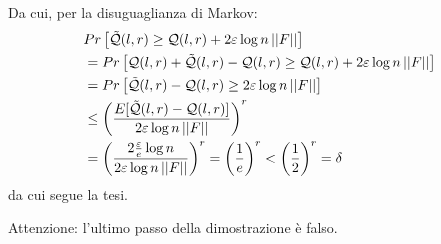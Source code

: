 \begin{proof*}
    Da cui, per la disuguaglianza di Markov:
    \begin{align}
        &Pr \left[\tilde{\mathcal{Q}}(l, r) \ge \mathcal{Q}(l, r)
            + 2 \varepsilon \log{n} \left|\left|F\right|\right|\right] \nonumber \\
        &=
        Pr \left[\mathcal{Q}(l, r) + \tilde{\mathcal{Q}}(l, r) - \mathcal{Q}(l, r) \ge \mathcal{Q}(l, r)
            + 2 \varepsilon \log{n} \left|\left|F\right|\right|\right] \nonumber \\
        &=
        Pr \left[\tilde{\mathcal{Q}}(l, r) - \mathcal{Q}(l, r) \ge
            2 \varepsilon \log{n} \left|\left|F\right|\right|\right] \nonumber \\
        &\le
        \left(
            \frac{E[\tilde{\mathcal{Q}}(l, r) - \mathcal{Q}(l, r)]}{2 \varepsilon \log{n} \left|\left|F\right|\right|}
        \right) ^ r
            \nonumber \\
        &=
        \left(
            \frac{2 \frac{\varepsilon}{e} \log{n}}{2 \varepsilon \log{n} \left|\left|F\right|\right|}
        \right)^r = \left(\frac{1}{e}\right)^r < \left(\frac{1}{2}\right)^r = \delta \nonumber 
    \end{align}
    da cui segue la tesi.

    Attenzione: l'ultimo passo della dimostrazione è falso.

\end{proof*}